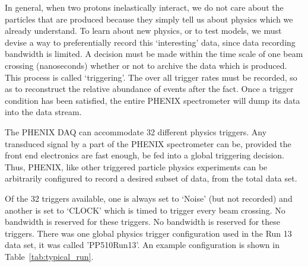 In general, when two protons inelastically interact, we do not care about the
particles that are produced because they simply tell us about physics which we
already understand. To learn about new physics, or to test models, we must
devise a way to preferentially record this `interesting'  data, since data
recording bandwidth is limited. A decision must be made within the time scale of
one beam crossing (nanoseconds) whether or not to archive the data which is
produced. This process is called `triggering'. The over all trigger rates must
be recorded, so as to reconstruct the relative abundance of events after the
fact. Once a trigger condition has been satisfied, the entire PHENIX
spectrometer will dump its data into the data stream.

The PHENIX DAQ can accommodate 32 different physics triggers. Any transduced
signal by a part of the PHENIX spectrometer can be, provided the front end
electronics are fast enough, be fed into a global triggering decision. Thus,
PHENIX, like other triggered particle physics experiments can be arbitrarily
configured to record a desired subset of data, from the total data set.

Of the 32 triggers available, one is always set to `Noise' (but not recorded)
and another is set to `CLOCK' which is timed to trigger every beam crossing. No
bandwidth is reserved for these triggers. No bandwidth is reserved for these
triggers. There was one global physics trigger configuration used in the Run 13
data set, it was called 'PP510Run13'. An example configuration is shown in
Table~\ref{tab:typical_run}.

